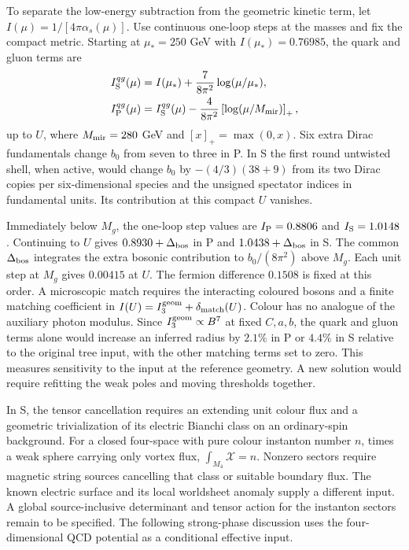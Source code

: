 \documentclass[aps,prd,reprint,onecolumn,nofootinbib,amsmath,amssymb]{revtex4-2}
\begin{document}
To separate the low-energy subtraction from the geometric kinetic term, let $I(\mu)=1/[4\pi\alpha_s(\mu)]$. Use continuous one-loop steps at the masses and fix the compact metric. Starting at $\mu_*=250$ GeV with $I(\mu_*)=0.76985$, the quark and gluon terms are
\begin{equation}
 \begin{aligned}
 I_{\rm S}^{qg}(\mu)&=I(\mu_*)+\frac{7}{8\pi^2}\log(\mu/\mu_*),\\
 I_{\rm P}^{qg}(\mu)&=I_{\rm S}^{qg}(\mu)
     -\frac{4}{8\pi^2}\left[\log(\mu/M_{\rm mir})\right]_+ ,
 \end{aligned}
\end{equation}
up to $U$, where $M_{\rm mir}=280$ GeV and $[x]_+=\max(0,x)$. Six extra Dirac fundamentals change $b_0$ from seven to three in P. In S the first round untwisted shell, when active, would change $b_0$ by $-(4/3)(38+9)$ from its two Dirac copies per six-dimensional species and the unsigned spectator indices in fundamental units. Its contribution at this compact $U$ vanishes.

Immediately below $M_g$, the one-loop step values are $I_{\rm P}=0.8806$ and $I_{\rm S}=1.0148$. Continuing to $U$ gives $0.8930+\Delta_{\rm bos}$ in P and $1.0438+\Delta_{\rm bos}$ in S. The common $\Delta_{\rm bos}$ integrates the extra bosonic contribution to $b_0/(8\pi^2)$ above $M_g$. Each unit step at $M_g$ gives $0.00415$ at $U$. The fermion difference $0.1508$ is fixed at this order. A microscopic match requires the interacting coloured bosons and a finite matching coefficient in $I(U)=I_3^{\rm geom}+\delta_{\rm match}(U)$. Colour has no analogue of the auxiliary photon modulus. Since $I_3^{\rm geom}\propto B^7$ at fixed $C,a,b$, the quark and gluon terms alone would increase an inferred radius by $2.1\%$ in P or $4.4\%$ in S relative to the original tree input, with the other matching terms set to zero. This measures sensitivity to the input at the reference geometry. A new solution would require refitting the weak poles and moving thresholds together.

In S, the tensor cancellation requires an extending unit colour flux and a geometric trivialization of its electric Bianchi class on an ordinary-spin background. For a closed four-space with pure colour instanton number $n$, times a weak sphere carrying only vortex flux, $\int_{M_4}\mathcal X=n$. Nonzero sectors require magnetic string sources cancelling that class or suitable boundary flux. The known electric surface and its local worldsheet anomaly supply a different input. A global source-inclusive determinant and tensor action for the instanton sectors remain to be specified. The following strong-phase discussion uses the four-dimensional QCD potential as a conditional effective input.
\end{document}
